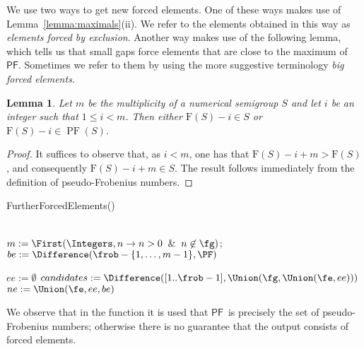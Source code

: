 \documentclass[11pt]{amsart}
\newtheorem{lemma}[theorem]{Lemma}
\theoremstyle{remark}
\begin{document}
We use two ways to get new forced elements. One of these ways makes use of Lemma~\ref{lemma:maximals}(ii). We refer to the elements obtained in this way as \emph{elements forced by exclusion}. Another way makes use of the following lemma, which tells us that small gaps force elements that are close to the maximum of {\ensuremath{\mathsf{PF}}}. Sometimes we refer to them by using the more suggestive terminology \emph{big forced elements}.
\begin{lemma}\label{lemma:big_elts}
Let $m$ be the multiplicity of a numerical semigroup $S$ and let $i$ be an integer such that $1\le i <m $. Then either $\mathrm{F}(S)-i\in S$ or $\mathrm{F}(S)-i\in\operatorname{PF}(S)$.
\end{lemma}
\begin{proof}
It suffices to observe that, as $i <m$, one has that  $\mathrm{F}(S)-i +m>\mathrm F(S)$, and consequently $\mathrm{F}(S)-i +m\in S$. The result follows immediately from the definition of pseudo-Frobenius numbers.
\end{proof}

\begin{function}[ht]\caption{FurtherForcedElements()\label{func:FurtherForcedElements}}
\FurtherForcedElementsw{\fg,\fe}\\

  $m := \First(\Integers,n \to n > 0 \And n \not\in \fg)$;\\
\nl\label{line:big_elts}
  $be := \Difference(\frob - \{1,\ldots,m - 1\}, \PF)$\;

 $ee := \emptyset$\;
\nl\label{line:excl_elts_if}
$candidates := \Difference([1 .. \frob-1], \Union(\fg,\Union(\fe,ee)))$\;
\nl\label{line:excl_elts_only_if}
  $ne := \Union(\fe,ee,be)$\;
  \nl\label{line:conflicts_elts}
\end{function}
We observe that in the function \FurtherForcedElements it is used that {\ensuremath{\mathsf{PF}}}\ is precisely the set of pseudo-Frobenius numbers; otherwise there is no guarantee that the output consists of forced elements.
\end{document}
